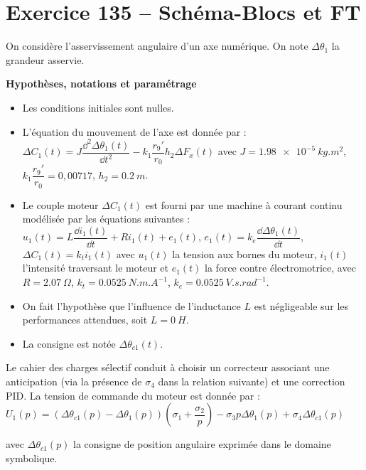 \section*{Exercice 135 -- Schéma-Blocs et FT}
\setcounter{exo}{0}

On considère l'asservissement angulaire d'un axe numérique. On note $\Delta \theta_1$ la grandeur asservie.

\textbf{Hypothèses, notations et paramétrage}

\begin{itemize}
\item Les conditions initiales sont nulles.
\item L'équation du mouvement de l’axe est donnée par : $\Delta C_1(t) = J \dfrac{\dd^2 \Delta \theta_1(t)}{\dd t^2}-k_1 \dfrac{r_9'}{r_0}h_2 \Delta F_x(t)$ avec $J=\SI{1,98e-5}{kg.m^2}$, $k_1 \dfrac{r_9'}{r_0} = 0,00717$, $h_2=\SI{0,2}{m}$. 
\item Le couple moteur $\Delta C_1(t)$ est fourni par une machine à courant continu modélisée par les équations suivantes : $u_1(t)=L\dfrac{\dd i_1(t)}{\dd t}+Ri_1(t) + e_1(t)$, $e_1(t)=k_e \dfrac{\dd \Delta \theta_1(t)}{\dd t}$, $\Delta C_1(t)=k_t i_1(t)$ avec $u_1(t)$ la tension aux bornes du moteur, $i_1(t)$ l’intensité traversant le moteur et $e_1(t)$ la force contre
électromotrice, avec $R=\SI{2,07}{\Omega}$,
$k_t=\SI{0,0525}{N.m.A^{-1}}$, $k_e=\SI{0,0525}{V.s.rad^{-1}}$.
\item On fait l’hypothèse que l’influence de l’inductance $L$ est négligeable sur les performances attendues, soit $L=\SI{0}{H}$.
\item La consigne est notée $\Delta \theta_{c1}(t)$.
\end{itemize}

Le cahier des charges sélectif conduit à choisir un correcteur associant une anticipation (via la présence de $\sigma_4$ dans la relation suivante) et une correction PID. La tension de commande du moteur est donnée par : 
$U_1(p)=\left( \Delta \theta_{c 1}(p)  - \Delta \theta_{1}(p)  \right) \left( \sigma_1 +\dfrac{\sigma_2}{p}\right) - \sigma_3 p \Delta \theta_1(p) + \sigma_4 \Delta \theta_{c1}(p)
 $

avec $\Delta \theta_{c1}(p)$ la consigne de position angulaire exprimée dans le domaine symbolique.



